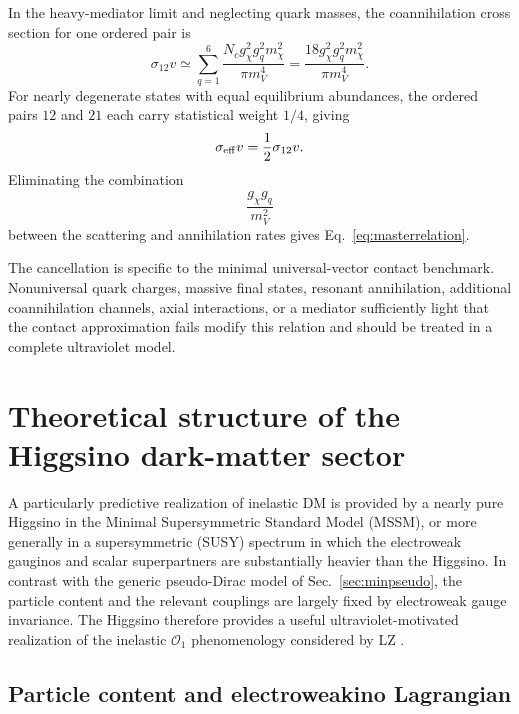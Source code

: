 \documentclass[aps,prd,reprint,superscriptaddress,nofootinbib,longbibliography,floatfix]{revtex4-2}
\begin{document}
In the heavy-mediator limit and neglecting quark masses, the coannihilation cross section for one ordered pair is
\begin{equation}
\sigma_{12}v
\simeq
\sum_{q=1}^{6}
\frac{
N_c g_\chi^2g_q^2m_\chi^2
}{
\pi m_V^4
}
=
\frac{
18g_\chi^2g_q^2m_\chi^2
}{
\pi m_V^4
}.
\end{equation}
For nearly degenerate states with equal equilibrium abundances, the ordered pairs $12$ and $21$ each carry statistical weight $1/4$, giving
\begin{equation}
\sigma_{\rm eff}v
=
\frac{1}{2}\sigma_{12}v.
\end{equation}
Eliminating the combination
\begin{equation}
\frac{g_\chi g_q}{m_V^2}
\end{equation}
between the scattering and annihilation rates gives Eq.~\eqref{eq:masterrelation}.

The cancellation is specific to the minimal universal-vector contact benchmark. Nonuniversal quark charges, massive final states, resonant annihilation, additional coannihilation channels, axial interactions, or a mediator sufficiently light that the contact approximation fails modify this relation and should be treated in a complete ultraviolet model.






\section{Theoretical structure of the Higgsino dark-matter sector}
\label{sec:higgsinotheory}

A particularly predictive realization of inelastic DM is provided by a nearly pure Higgsino in the Minimal Supersymmetric Standard Model (MSSM), or more generally in a supersymmetric (SUSY) spectrum in which the electroweak gauginos and scalar superpartners are substantially heavier than the Higgsino. In contrast with the generic pseudo-Dirac model of Sec.~\ref{sec:minpseudo}, the particle content and the relevant couplings are largely fixed by electroweak gauge invariance. The Higgsino therefore provides a useful ultraviolet-motivated realization of the inelastic $\mathcal{O}_1$ phenomenology considered by LZ \cite{NagataShirai2015,KrallReece2018,Graham2025,LZ2026Extended}.

\subsection{Particle content and electroweakino Lagrangian}
\end{document}
